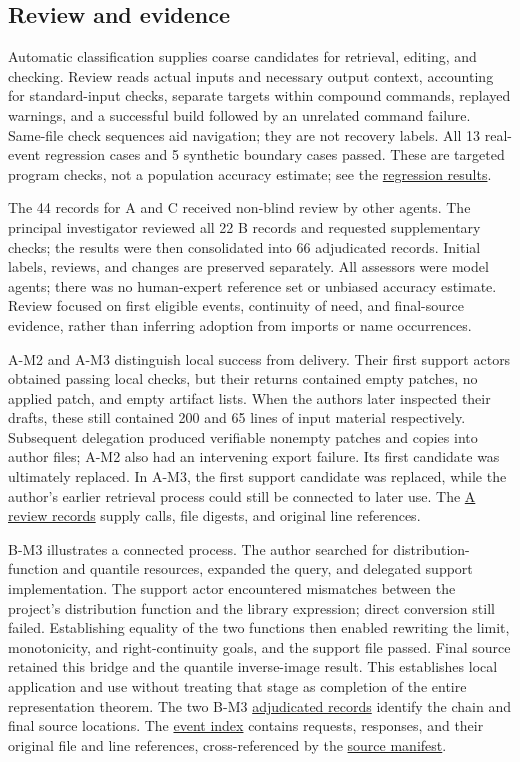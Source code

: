 \subsection[Review and evidence]{\texorpdfstring{\protect\hypertarget{s3}{}Review and evidence}{Review and evidence}}
Automatic classification supplies coarse candidates for retrieval, editing, and checking. Review reads actual inputs and necessary output context, accounting for standard-input checks, separate targets within compound commands, replayed warnings, and a successful build followed by an unrelated command failure. Same-file check sequences aid navigation; they are not recovery labels. All 13 real-event regression cases and 5 synthetic boundary cases passed. These are targeted program checks, not a population accuracy estimate; see the \href{research/review/code_audit/regression_results.json}{regression results}.

The 44 records for A and C received non-blind review by other agents. The principal investigator reviewed all 22 B records and requested supplementary checks; the results were then consolidated into 66 adjudicated records. Initial labels, reviews, and changes are preserved separately. All assessors were model agents; there was no human-expert reference set or unbiased accuracy estimate. Review focused on first eligible events, continuity of need, and final-source evidence, rather than inferring adoption from imports or name occurrences.

A-M2 and A-M3 distinguish local success from delivery. Their first support actors obtained passing local checks, but their returns contained empty patches, no applied patch, and empty artifact lists. When the authors later inspected their drafts, these still contained 200 and 65 lines of input material respectively. Subsequent delegation produced verifiable nonempty patches and copies into author files; A-M2 also had an intervening export failure. Its first candidate was ultimately replaced. In A-M3, the first support candidate was replaced, while the author's earlier retrieval process could still be connected to later use. The \href{research/semantic/review_A.json}{A review records} supply calls, file digests, and original line references.

B-M3 illustrates a connected process. The author searched for distribution-function and quantile resources, expanded the query, and delegated support implementation. The support actor encountered mismatches between the project's distribution function and the library expression; direct conversion still failed. Establishing equality of the two functions then enabled rewriting the limit, monotonicity, and right-continuity goals, and the support file passed. Final source retained this bridge and the quantile inverse-image result. This establishes local application and use without treating that stage as completion of the entire representation theorem. The two B-M3 \href{research/semantic/adjudicated_annotations.json}{adjudicated records} identify the chain and final source locations. The \href{research/extraction/events.jsonl}{event index} contains requests, responses, and their original file and line references, cross-referenced by the \href{research/extraction/source_manifest.json}{source manifest}.


